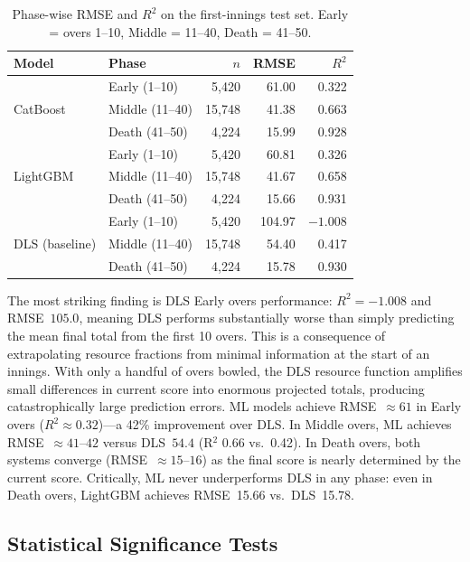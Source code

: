 \documentclass[10pt,a4paper,twocolumn]{article}
\begin{document}
\begin{table}[htbp]
\centering
\caption{Phase-wise RMSE and $R^2$ on the first-innings test set. Early = overs 1--10, Middle = 11--40, Death = 41--50.}
\label{tab:phase_wise}
\small
\begin{tabular}{llrrr}
\toprule
\textbf{Model} & \textbf{Phase} & \textbf{$n$} & \textbf{RMSE} & $R^2$ \\
\midrule
\multirow{3}{*}{CatBoost} & Early (1--10) & 5{,}420 & 61.00 & 0.322 \\
 & Middle (11--40) & 15{,}748 & 41.38 & 0.663 \\
 & Death (41--50) & 4{,}224 & 15.99 & 0.928 \\
\midrule
\multirow{3}{*}{LightGBM} & Early (1--10) & 5{,}420 & 60.81 & 0.326 \\
 & Middle (11--40) & 15{,}748 & 41.67 & 0.658 \\
 & Death (41--50) & 4{,}224 & 15.66 & 0.931 \\
\midrule
\multirow{3}{*}{DLS (baseline)} & Early (1--10) & 5{,}420 & 104.97 & $-1.008$ \\
 & Middle (11--40) & 15{,}748 & 54.40 & 0.417 \\
 & Death (41--50) & 4{,}224 & 15.78 & 0.930 \\
\bottomrule
\end{tabular}
\end{table}

The most striking finding is DLS Early overs performance: $R^2 = -1.008$ and RMSE~$105.0$, meaning DLS performs substantially worse than simply predicting the mean final total from the first 10 overs. This is a consequence of extrapolating resource fractions from minimal information at the start of an innings. With only a handful of overs bowled, the DLS resource function amplifies small differences in current score into enormous projected totals, producing catastrophically large prediction errors. ML models achieve RMSE~$\approx 61$ in Early overs ($R^2 \approx 0.32$)---a 42\% improvement over DLS. In Middle overs, ML achieves RMSE~$\approx 41$--$42$ versus DLS~$54.4$ (R$^2$ 0.66 vs.\ 0.42). In Death overs, both systems converge (RMSE~$\approx 15$--$16$) as the final score is nearly determined by the current score. Critically, ML never underperforms DLS in any phase: even in Death overs, LightGBM achieves RMSE~15.66 vs.\ DLS~15.78.

\subsection{Statistical Significance Tests}
\end{document}
